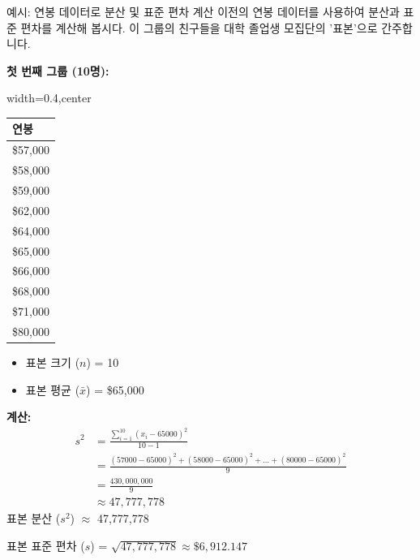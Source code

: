 \documentclass[11pt,a4paper]{article}
\begin{document}
\begin{examplebox}{예시: 연봉 데이터로 분산 및 표준 편차 계산}
이전의 연봉 데이터를 사용하여 분산과 표준 편차를 계산해 봅시다. 이 그룹의 친구들을 대학 졸업생 모집단의 '표본'으로 간주합니다.

\textbf{첫 번째 그룹 (10명):}
\begin{adjustbox}{width=0.4\textwidth,center}
\begin{tabular}{l}
\toprule
\textbf{연봉} \\
\midrule
\$57,000 \\
\$58,000 \\
\$59,000 \\
\$62,000 \\
\$64,000 \\
\$65,000 \\
\$66,000 \\
\$68,000 \\
\$71,000 \\
\$80,000 \\
\bottomrule
\end{tabular}
\end{adjustbox}
\label{tab:salary_example1_sd}
\begin{itemize}
    \item 표본 크기 ($n$) = 10
    \item 표본 평균 ($\bar{x}$) = \$65,000
\end{itemize}
\textbf{계산:}
\begin{align*}
    s^2 &= \frac{\sum_{i=1}^{10} (x_i - 65000)^2}{10-1} \\
    &= \frac{(57000-65000)^2 + (58000-65000)^2 + \dots + (80000-65000)^2}{9} \\
    &= \frac{430,000,000}{9} \\
    &\approx 47,777,778
\end{align*}
표본 분산 ($s^2$) $\approx$ 47,777,778

표본 표준 편차 ($s$) = $\sqrt{47,777,778} \approx \$6,912.147$


\end{examplebox}
\end{document}
